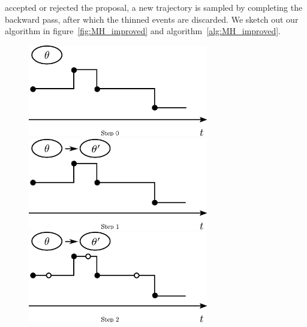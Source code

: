    accepted or rejected the proposal, a new trajectory is sampled by
   completing the backward pass, after which the thinned events are
   discarded. We sketch out our algorithm in 
   figure~\ref{fig:MH_improved} and algorithm~\ref{alg:MH_improved}.
\setlength{\unitlength}{0.8cm}
  \begin{figure}[H]
  \centering
  \begin{minipage}[!hp]{0.45\linewidth}
  \centering
    \includegraphics [width=0.70\textwidth, angle=0]{figs/plot0.pdf}
      \end{minipage}
  \begin{minipage}[hp]{0.45\linewidth}
  \centering
    \includegraphics [width=0.70\textwidth, angle=0]{figs/plot1.pdf}
    \vspace{-0 in}
  \end{minipage}
  \begin{minipage}[hp]{0.45\linewidth}
  \centering
    \includegraphics [width=0.70\textwidth, angle=0]{figs/plot2.pdf}
    \vspace{-0 in}
  \end{minipage}
  \begin{minipage}[hp]{0.45\linewidth}

\end{minipage}
\end{figure}
